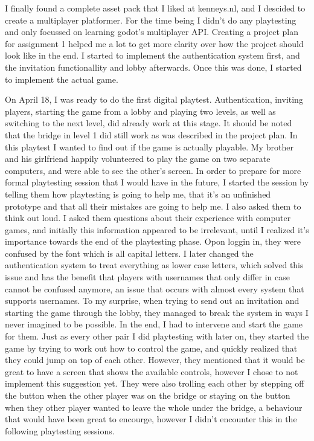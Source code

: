 \documentclass{article}
\begin{document}
\bigskip
I finally found a complete asset pack that I liked at kenneys.nl, and I descided to create a multiplayer platformer. For the time being I didn't do any playtesting and only focussed on learning godot's multiplayer API. Creating a project plan for assignment 1 helped me a lot to get more clarity over how the project should look like in the end. I started to implement the authentication system first, and the invitation functionallity and lobby afterwards. Once this was done, I started to implement the actual game. 

\bigskip
On April 18, I was ready to do the first digital playtest. Authentication, inviting players, starting the game from a lobby and playing two levels, as well as switching to the next level, did already work at this stage. It should be noted that the bridge in level 1 did still work as was described in the project plan. In this playtest I wanted to find out if the game is actually playable. My brother and his girlfriend happily volunteered to play the game on two separate computers, and were able to see the other's screen. In order to prepare for more formal playtesting session that I would have in the future, I started the session by telling them how playtesting is going to help me, that it's an unfinished prototype and that all their mistakes are going to help me. I also asked them to think out loud.
I asked them questions about their experience with computer games, and initially this information appeared to be irrelevant, until I realized it's importance towards the end of the playtesting phase.
Opon loggin in, they were confused by the font which is all capital letters. I later changed the authentication system to treat everything as lower case letters, which solved this issue and has the benefit that players with usernames that only differ in case cannot be confused anymore, an issue that occurs with almost every system that supports usernames.
To my surprise, when trying to send out an invitation and starting the game through the lobby, they managed to break the system in ways I never imagined to be possible. In the end, I had to intervene and start the game for them.
Just as every other pair I did playtesting with later on, they started the game by trying to work out how to control the game, and quickly realized that they could jump on top of each other. However, they mentioned that it would be great to have a screen that shows the available controls, however I chose to not implement this suggestion yet.
They were also trolling each other by stepping off the button when the other player was on the bridge or staying on the button when they other player wanted to leave the whole under the bridge, a behaviour that would have been great to encourge, however I didn't encounter this in the following playtesting sessions.
\end{document}

